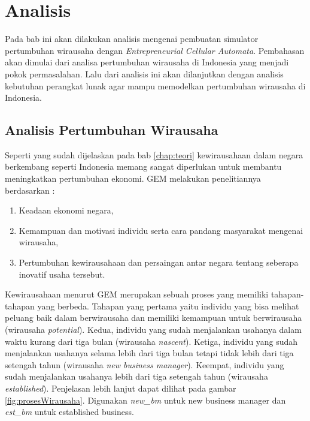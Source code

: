 \chapter{Analisis}
\label{chap:analisis}


Pada bab ini akan dilakukan analisis mengenai pembuatan simulator pertumbuhan wirausaha dengan \textit{Entrepreneurial Cellular Automata}. Pembahasan akan dimulai dari analisa pertumbuhan wirausaha di Indonesia yang menjadi pokok permasalahan. Lalu dari analisis ini akan dilanjutkan dengan analisis kebutuhan perangkat lunak agar mampu memodelkan pertumbuhan wirausaha di Indonesia.

\section{Analisis Pertumbuhan Wirausaha}
\label{sec:analisisPertumbuhanWirausaha}

Seperti yang sudah dijelaskan pada bab \ref{chap:teori} kewirausahaan dalam negara berkembang seperti Indonesia memang sangat diperlukan untuk membantu meningkatkan pertumbuhan ekonomi. GEM melakukan penelitiannya berdasarkan :
\begin{enumerate}
	\item Keadaan ekonomi negara,
	\item Kemampuan dan motivasi individu serta cara pandang masyarakat mengenai wirausaha,
	\item Pertumbuhan kewirausahaan dan persaingan antar negara tentang seberapa inovatif usaha tersebut.
\end{enumerate}  

Kewirausahaan menurut GEM merupakan sebuah proses yang memiliki tahapan-tahapan yang berbeda. Tahapan yang pertama yaitu individu yang bisa melihat peluang baik dalam berwirausaha dan memiliki kemampuan untuk berwirausaha (wirausaha \textit{potential}). Kedua, individu yang sudah menjalankan usahanya dalam waktu kurang dari tiga bulan (wirausaha \textit{nascent}). Ketiga, individu yang sudah menjalankan usahanya selama lebih dari tiga bulan tetapi tidak lebih dari tiga setengah tahun (wirausaha \textit{new business manager}). Keempat, individu yang sudah menjalankan usahanya lebih dari tiga setengah tahun (wirausaha \textit{established}). Penjelasan lebih lanjut dapat dilihat pada gambar \ref{fig:prosesWirausaha}. Digunakan \textit{new\_bm} untuk new business manager dan \textit{est\_bm} untuk established business. 

